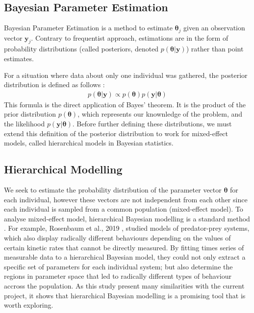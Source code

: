 \documentclass[11pt]{article}
\begin{document}
\subsection{Bayesian Parameter Estimation}

Bayesian Parameter Estimation is a method to estimate $\boldsymbol{\theta}_j$ given an observation vector $\boldsymbol{y}_j$. Contrary to frequentist approach, estimations are in the form of probability distributions (called posteriors, denoted $p(\boldsymbol{\theta}|\boldsymbol{y})$) rather than point estimates. 

For a situation where data about only one individual was gathered, the posterior distribution is defined as follows \cite{tbk_gelman}:
\begin{align*}
    p(\boldsymbol{\theta} | \boldsymbol{y}) \propto p(\boldsymbol{\theta})p(\boldsymbol{y}|\boldsymbol{\theta})
\end{align*} 
This formula is the direct application of Bayes' theorem. It is the product of the prior distribution $p(\boldsymbol{\theta})$, which represents our knownledge of the problem, and the likelihood $p(\boldsymbol{y} | \boldsymbol{\theta})$. Before further defining these distributions, we must extend this definition of the posterior distribution to work for mixed-effect models, called hierarchical models in Bayesian statistics. 

\subsection{Hierarchical Modelling}
We seek to estimate the probability distribution of the parameter vector $\boldsymbol{\theta}$ for each individual, however these vectors are not independent from each other since each individual is sampled from a common population (mixed-effect model). To analyse mixed-effect model, hierarchical Bayesian modelling is a standard method \cite{revParamEst}\cite{rosenbaum}. For example, Rosenbaum et al., 2019 \cite{rosenbaum}, studied models of predator-prey systems, which also display radically different behaviours depending on the values of certain kinetic rates that cannot be directly measured. By fitting times series of measurable data to a hierarchical Bayesian model, they could not only extract a specific set of parameters for each individual system; but also determine the regions in parameter space that led to radically different types of behaviour accross the population. As this study present many similarities with the current project, it shows that hierarchical Bayesian modelling is a promising tool that is worth exploring.
\end{document}
